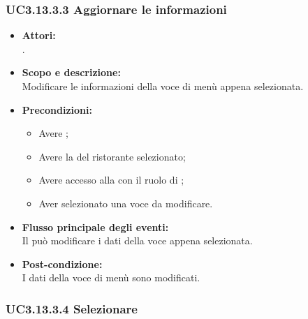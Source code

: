 \subsubsection{UC3.13.3.3 Aggiornare le informazioni} \label{UC3.13.3.3}

\begin{itemize}
	\item \textbf{Attori:}
	\\.
	\item \textbf{Scopo e descrizione:} 
	\\Modificare le informazioni della voce di menù appena selezionata.
	\item \textbf{Precondizioni:}
	\begin{itemize}
		\item Avere ;
		\item Avere la  del ristorante selezionato;
		\item Avere accesso alla  con il ruolo di ;
		\item Aver selezionato una voce da modificare.
	\end{itemize}
	\item \textbf{Flusso principale degli eventi:}
	\\Il {} può modificare i dati della voce appena selezionata.
	\item \textbf{Post-condizione:}
	\\I dati della voce di menù sono modificati.
\end{itemize}

\subsubsection{UC3.13.3.4 Selezionare } \label{UC3.13.3.4}

